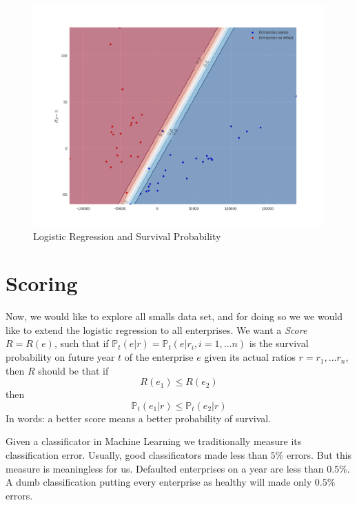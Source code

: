 \documentclass[DIV=calc, paper=a4, fontsize=11pt, twocolumn]{scrartcl}
\begin{document}
\begin{figure}
  \centering
    \includegraphics[width=\linewidth]{reglogsample}
  \caption{Logistic Regression and Survival Probability}
  \label{fig:reglogsample}
\end{figure}

\section{Scoring}
Now, we would like to explore all smalls data set, and for doing so we  we would like to extend the logistic regression to all 
enterprises.  
We want a \emph{Score} $R= R(e)$, such that if $\mathbb{P}_t(e|r) = \mathbb{P}_t(e| r_i, i=1, \dots n)$ 
is the survival probability on future year $t$ of the enterprise $e$ given its actual ratios $r = r_1, \ldots r_n$, then
$R$ should be that if
$$R(e_1) \leq R(e_2)$$
then 
$$\mathbb{P}_t(e_1| r) \leq \mathbb{P}_t(e_2| r)$$
In words: a better score means a better probability of survival.

Given a classificator in Machine Learning we traditionally measure its classification error. Usually, good classificators 
made less than $5\%$ errors. But this measure is meaningless for us. Defaulted enterprises on a year are less than $0.5\%$. 
A dumb classification putting every enterprise as healthy will made only $0.5\%$ errors.
\end{document}
